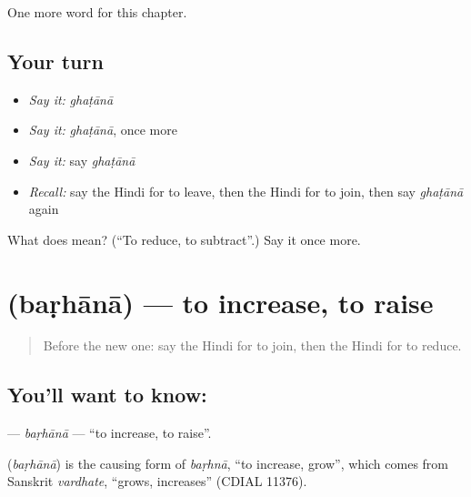 \begin{grammarlens}[title={What you've built}]
One more word for this chapter.
\end{grammarlens}

\subsection*{Your turn}
\begin{itemize}
\raggedright
  \item \emph{Say it:} \emph{ghaṭānā}
  \item \emph{Say it:} \emph{ghaṭānā}, once more
  \item \emph{Say it:} say \emph{ghaṭānā}
  \item \emph{Recall:} say the Hindi for to leave, then the Hindi for to join, then say \emph{ghaṭānā} again
\end{itemize}

\begin{tcolorbox}[breakable,colback=teal!4,colframe=teal!35!black,title={Before you move on}]
What does  mean? (\textquotedblleft{}To reduce, to subtract\textquotedblright{}.) Say it once more.
\end{tcolorbox}
\section[\texorpdfstring{\hi{बढ़ाना} (baṛhānā)}{बढ़ाना (baṛhānā)}]{ (baṛhānā) — to increase, to raise}

\label{lesson:HI-C169-barhana}



\begin{quote}
Before the new one: say the Hindi for to join, then the Hindi for to reduce.
\end{quote}

\subsection*{You'll want to know: }
\textbf{} — \emph{baṛhānā} — \textquotedblleft{}to increase, to raise\textquotedblright{}.

\begin{cousinweb}
\textbf{} (\emph{baṛhānā}) is the causing form of \emph{baṛhnā}, \textquotedblleft{}to increase, grow\textquotedblright{}, which comes from Sanskrit \emph{vardhate}, \textquotedblleft{}grows, increases\textquotedblright{} (CDIAL 11376).
\end{cousinweb}

